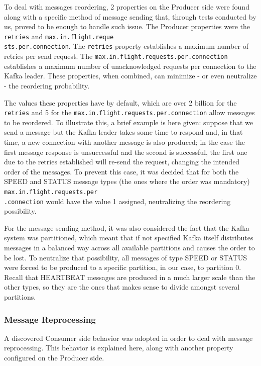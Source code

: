 \documentclass[12pt]{article}
\begin{document}
To deal with messages reordering, 2 properties on the Producer side were found along with a specific method of message sending that, through tests conducted by 
us, proved to be enough to handle such issue.
The Producer properties were the \texttt{retries} and \texttt{max.in.flight.reque\\sts.per.connection}.
The \texttt{retries} property establishes a maximum number of retries per send request.
The \texttt{max.in.flight.requests.per.connection} establishes a maximum number of unacknowledged requests per connection to the Kafka leader. 
These properties, when combined, can minimize - or even neutralize - the reordering probability. 

The values these properties have by default, which are over 2 billion for the \texttt{retries} and 5 for the \texttt{max.in.flight.requests.per.connection} allow 
messages to be reordered.
To illustrate this, a brief example is here given:
suppose that we send a message but the Kafka leader takes some time to respond and, in that time, a new connection with another message is also produced; 
in the case the first message response is unsuccessful and the second is successful, the first one due to the retries established will re-send the request, 
changing the intended order of the messages. 
To prevent this case, it was decided that for both the SPEED and STATUS message types (the ones where the order was mandatory) 
\texttt{max.in.flight.requests.per\\.connection} would have the value 1 assigned, neutralizing the reordering possibility.

For the message sending method, it was also considered the fact that the Kafka system was partitioned, which meant that if not specified Kafka itself distributes 
messages in a balanced way across all available partitions and causes the order to be lost. 
To neutralize that possibility, all messages of type SPEED or STATUS were forced to be produced to a specific partition, in our case, to partition 0.
Recall that HEARTBEAT messages are produced in a much larger scale than the other types, so they are the ones that makes sense to divide amongst several partitions.

\subsubsection{Message Reprocessing}\label{reprocessing}

A discovered Consumer side behavior was adopted in order to deal with message reprocessing.
This behavior is explained here, along with another property configured on the Producer side.
\end{document}
